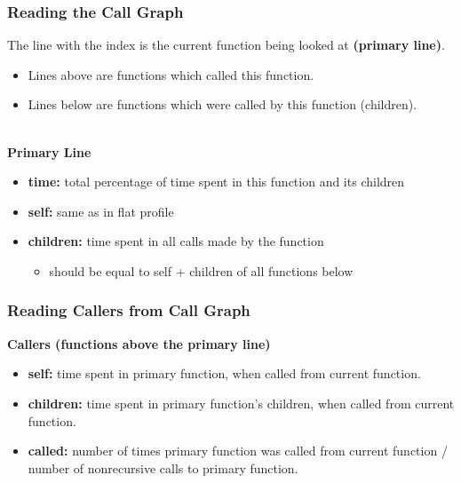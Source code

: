 \begin{frame}[fragile]
  \frametitle{Reading the Call Graph}


\begin{changemargin}{1.5cm}
  
    The line with the index is the current function being looked at {\bf (primary line)}.\\
\begin{itemize}
    \item Lines above are functions which called this function.
    \item Lines below are functions which were called by this function
      (children).
  \end{itemize}
~\\
  {\bf Primary Line}

  \begin{itemize}  
    \item {\bf time:} total percentage of time spent in this function and its
      children
    \item {\bf self:} same as in flat profile
    \item {\bf children:} time spent in all calls made by the function
      \begin{itemize}
        \item should be equal to self + children of all functions below
      \end{itemize}
  \end{itemize}
  \end{changemargin}
\end{frame}

\begin{frame}[fragile]
  \frametitle{Reading Callers from Call Graph}

  

\begin{changemargin}{1.5cm}
  {\bf Callers (functions above the primary line)}
  \begin{itemize}  
    \item {\bf self:} time spent in primary function, when called from current
      function.
    \item {\bf children:} time spent in primary function's children, when
      called from current function.
    \item {\bf called:} number of times primary function was called from current
      function / number of nonrecursive calls to primary function.
  \end{itemize}
  \end{changemargin}
\end{frame}

